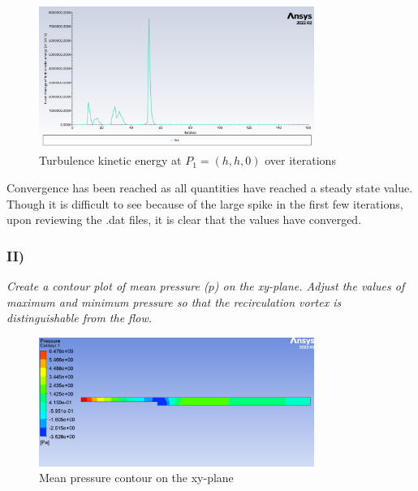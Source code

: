 \begin{figure}[H]
    \centering
    \includegraphics[width=0.8\textwidth]{Questions/Figures/Tke at point.png}
    \caption{Turbulence kinetic energy at $P_1 = (h, h, 0)$ over iterations}
\end{figure}
Convergence has been reached as all quantities have reached a steady state value. Though it is difficult to see because of the large spike in the first few iterations, upon reviewing the .dat files, it is clear that the values have converged.

\subsubsection{II)}
\textit{Create a contour plot of mean pressure ($p$) on the xy-plane. Adjust the values of maximum and minimum pressure so that the recirculation vortex is distinguishable from the flow.}
\begin{figure}[H]
    \centering
    \includegraphics[width=0.8\textwidth]{Questions/Figures/pressure contour.png}
    \caption{Mean pressure contour on the xy-plane}
\end{figure}

